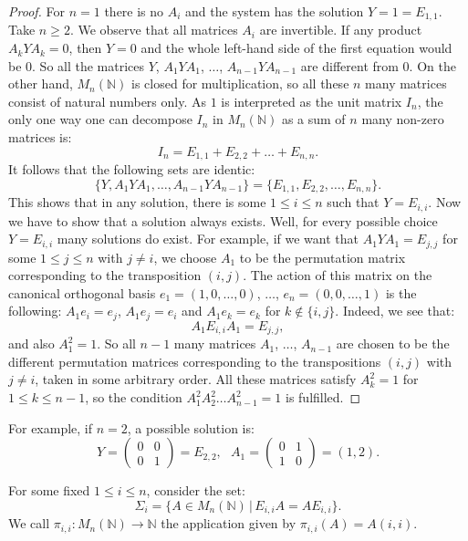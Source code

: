 \documentclass{article}
\theoremstyle{plain}
\theoremstyle{definition}
\begin{document}
\begin{proof}
For $n=1$ there is no $A_i$ and the system has the solution $Y = 1 = E_{1,1}$. Take $n \geq 2$. We observe that all matrices $A_i$ are invertible. If any product $A_k YA_k = 0$, then $Y = 0$ and the whole left-hand side of the first equation would be $0$. So all the matrices $Y$, $A_1YA_1$, $\dots$, $A_{n-1}YA_{n-1}$ are different from $0$. On the other hand, $M_n(\mathbb N)$ is closed for multiplication, so all these $n$ many matrices consist of natural numbers only. As $1$ is interpreted as the unit matrix $I_n$, the only one way one can decompose $I_n$ in $M_n(\mathbb N)$ as a sum of $n$ many non-zero matrices is:
$$I_n = E_{1,1} + E_{2,2} + \dots + E_{n,n}.$$
It follows that the following sets are identic:
$$\{Y, A_1YA_1, \dots, A_{n-1}YA_{n-1}\} = \{E_{1,1}, E_{2,2}, \dots, E_{n,n}\}.$$
This shows that in any solution, there is some $1 \leq i \leq n$ such that $Y = E_{i,i}$. Now we have to show that a solution always exists. Well, for every possible choice $Y = E_{i,i}$ many solutions do exist. For example, if we want that $A_1YA_1 = E_{j,j}$ for some $1 \leq j \leq n$ with $j \neq i$, we choose $A_1$ to be the permutation matrix corresponding to the transposition $(i,j)$. The action of this matrix on the canonical orthogonal basis $e_1 = (1, 0, \dots, 0)$, $\dots$, $e_n = (0, 0, \dots, 1)$ is the following:  $A_1 e_i = e_j$, $A_1e_j = e_i$ and $A_1 e_k = e_k$ for $k \notin \{i,j\}$. Indeed, we see that:
$$A_1 E_{i,i} A_1 = E_{j,j},$$
and also $A_1^2 = 1$. So all $n-1$ many matrices $A_1$, $\dots$, $A_{n-1}$ are chosen to be the different permutation matrices corresponding to the transpositions $(i,j)$ with $j \neq i$, taken in some arbitrary order. All these matrices satisfy $A_k^2 = 1$ for $1 \leq k \leq n-1$, so the condition $A_1^2A_2^2 \dots A_{n-1}^2 = 1$ is fulfilled. 
\end{proof} 

For example, if $n = 2$, a possible solution is:
$$Y= \begin{pmatrix} 0 & 0 \\ 0 & 1 \end{pmatrix}= E_{2,2},\,\,\,\, A_1 = \begin{pmatrix} 0 & 1 \\ 1 & 0 \end{pmatrix} = (1,2).$$

For some fixed $1 \leq i \leq n$, consider the set:
$$\Sigma_i = \{ A \in M_n(\mathbb N) \,|\, E_{i,i} A = A E_{i,i} \}.$$ 
We call $\pi_{i,i}: M_n(\mathbb N) \rightarrow \mathbb N$ the application given by $\pi_{i,i}(A) = A(i,i)$. 
\end{document}
